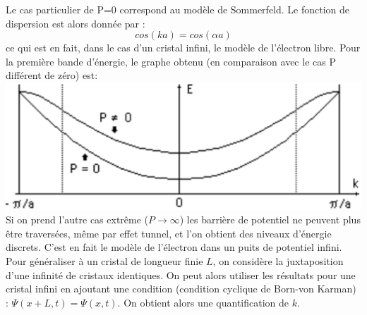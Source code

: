 Le cas particulier de P=0 correspond au modèle de Sommerfeld. Le fonction de dispersion est alors donnée par :
\begin{equation}
cos(ka)=cos(\alpha a)
\end{equation}
ce qui est en fait, dans le cas d'un cristal infini, le modèle de l'électron libre. Pour la première bande d'énergie, le graphe obtenu (en comparaison avec le cas P différent de zéro) est:
\\\includegraphics[scale=0.4]{somer.eps} \\
Si on prend l'autre cas extrême ($P\rightarrow \infty$) les barrière de potentiel ne peuvent plus être traversées, même par effet tunnel, et l'on obtient des niveaux d'énergie discrets. C'est en fait le modèle de l'électron dans un puits de potentiel infini. \\
Pour généraliser à un cristal de longueur finie $L$, on considère la juxtaposition d'une infinité de cristaux identiques. On peut alors utiliser les résultats pour une cristal infini en ajoutant une condition (condition cyclique de Born-von Karman) : $\Psi(x+L,t) = \Psi(x,t)$. On obtient alors une quantification de $k$.
